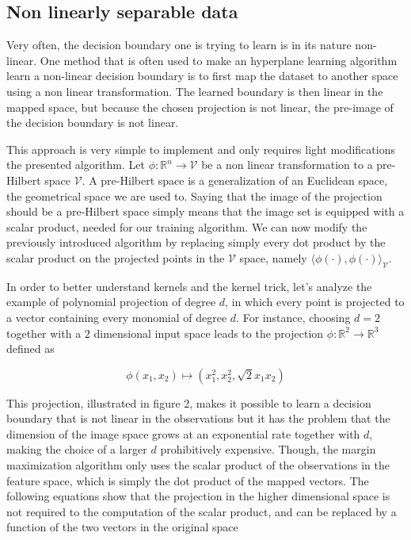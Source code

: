 \subsection{Non linearly separable data}

Very often, the decision boundary one is trying to learn is in its nature non-linear. One method that is often used to make an hyperplane learning algorithm learn a non-linear decision boundary is to first map the dataset to another space using a non linear transformation. The learned boundary is then linear in the mapped space, but because the chosen projection is not linear, the pre-image of the decision boundary is not linear.

This approach is very simple to implement and only requires light modifications the presented algorithm. Let $\phi : \mathbb{R}^n \rightarrow \mathcal{V}$ be a non linear transformation to a pre-Hilbert space $\mathcal{V}$. A pre-Hilbert space is a generalization of an Euclidean space, the geometrical space we are used to. Saying that the image of the projection should be a pre-Hilbert space simply means that the image set is equipped with a scalar product, needed for our training algorithm. We can now modify the previously introduced algorithm by replacing simply every dot product by the scalar product on the projected points in the $\mathcal{V}$ space, namely $\langle \phi(\cdot), \phi(\cdot)\rangle _{\mathcal{V}}$.

In order to better understand kernels and the kernel trick, let's analyze the example of polynomial projection of degree $d$, in which every point is projected to a vector containing every monomial of degree $d$. For instance, choosing $d = 2$ together with a $2$ dimensional input space leads to the projection $\phi : \mathbb{R}^2 \rightarrow \mathbb{R}^3$ defined as

\begin{equation*}
    \phi(x_1, x_2) \mapsto (x_1^2, x_2^2, \sqrt{2}x_1x_2)
\end{equation*}

This projection, illustrated in figure 2, makes it possible to learn a decision boundary that is not linear in the observations but it has the problem that the dimension of the image space grows at an exponential rate together with $d$, making the choice of a larger $d$ prohibitively expensive. Though, the margin maximization algorithm only uses the scalar product of the observations in the feature space, which is simply the dot product of the mapped vectors. The following equations show that the projection in the higher dimensional space is not required to the computation of the scalar product, and can be replaced by a function of the two vectors in the original space

